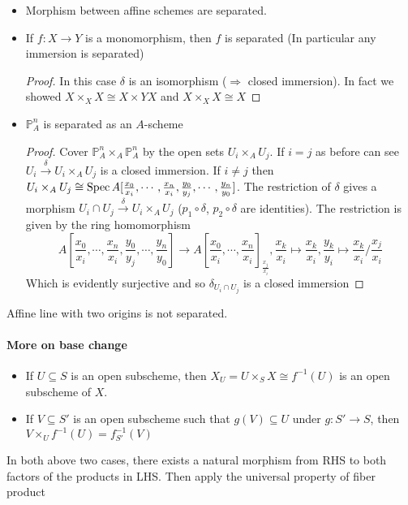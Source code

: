 \documentclass[main]{subfiles}
\begin{document}
\begin{itemize}
\item Morphism between affine schemes are separated.
\item If $f:X\to Y$ is a monomorphism, then $f$ is separated (In particular any immersion is separated)
\begin{proof}
In this case $\delta$ is an isomorphism ($\Rightarrow$ closed immersion). In fact we showed $X\times_XX\cong X\times YX$ and $X\times_XX\cong X$
\end{proof}
\item $\mathbb P_A^n$ is separated as an $A$-scheme
\begin{proof}
Cover $\mathbb P_A^n\times_A\mathbb P_A^n$ by the open sets $U_i\times_AU_j$. If $i=j$ as before can see $U_i\xrightarrow{\delta}U_i\times_AU_j$ is a closed immersion. If $i\neq j$ then $U_i\times_AU_j\cong\operatorname{Spec} A[\frac{x_0}{x_i},\cdots,\frac{x_n}{x_i},\frac{y_0}{y_j},\cdots,\frac{y_n}{y_0}]$. The restriction of $\delta$ gives a morphism $U_i\cap U_j\xrightarrow{\delta}U_i\times_AU_j$ ($p_1\circ\delta$, $p_2\circ\delta$ are identities). The restriction is given by the ring homomorphism
\[
A[\frac{x_0}{x_i},\cdots,\frac{x_n}{x_i},\frac{y_0}{y_j},\cdots,\frac{y_n}{y_0}]\to A[\frac{x_0}{x_i},\cdots,\frac{x_n}{x_i}]_{\frac{x_j}{x_i}},\frac{x_k}{x_i}\mapsto\frac{x_k}{x_i},\frac{y_k}{y_i}\mapsto\frac{x_k}{x_i}/\frac{x_j}{x_i}
\]
Which is evidently surjective and so $\delta_{U_i\cap U_j}$ is a closed immersion
\end{proof}
\end{itemize}

\begin{example}
Affine line with two origins is not separated.
\end{example}

\paragraph{More on base change}
\begin{itemize}
\item If $U\subseteq S$ is an open subscheme, then $X_U=U\times_SX\cong f^{-1}(U)$ is an open subscheme of $X$.
\item If $V\subseteq S'$ is an open subscheme such that $g(V)\subseteq U$ under $g:S'\to S$, then $V\times_Uf^{-1}(U)=f^{-1}_{S'}(V)$
\end{itemize}

In both above two cases, there exists a natural morphism from RHS to both factors of the products in LHS. Then apply the universal property of fiber product
\end{document}
